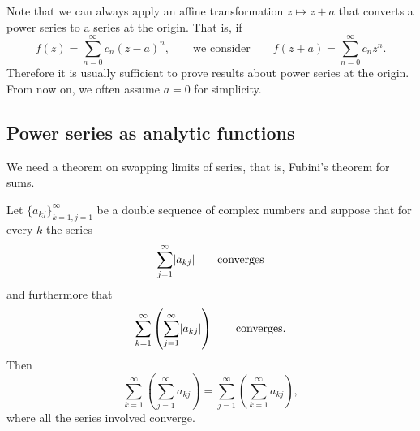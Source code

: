 \medskip

Note that we can always apply an affine transformation $z \mapsto z+a$ that
converts a power series to a series at the origin.
That is, if
\begin{equation*}
f(z) = \sum_{n=0}^\infty c_n {(z-a)}^n,
\qquad \text{we consider} \qquad
f(z+a) = \sum_{n=0}^\infty c_n {z}^n.
\end{equation*}
Therefore it is usually
sufficient to prove results about power series at the origin.
From now on, we often assume $a=0$ for simplicity.

\subsection{Power series as analytic functions}

We need a theorem on swapping limits of series, that is, 
Fubini's theorem for sums.

\begin{thm} \label{thm:fubiniforsums}
Let $\{ a_{kj} \}_{k=1,j=1}^\infty$ be a double
sequence of complex numbers and suppose that for every $k$ the series
\begin{equation*}
\sum_{j=1}^\infty \lvert {a_{kj}} \rvert \qquad \text{converges}
\end{equation*}
and furthermore that
\begin{equation*}
\sum_{k=1}^\infty \left( \sum_{j=1}^\infty \lvert {a_{kj}} \rvert \right)
\qquad \text{converges}.
\end{equation*}
Then
\begin{equation*}
\sum_{k=1}^\infty \left( \sum_{j=1}^\infty a_{kj} \right)
=
\sum_{j=1}^\infty \left( \sum_{k=1}^\infty a_{kj} \right) ,
\end{equation*}
where all the series involved converge.
\end{thm}

